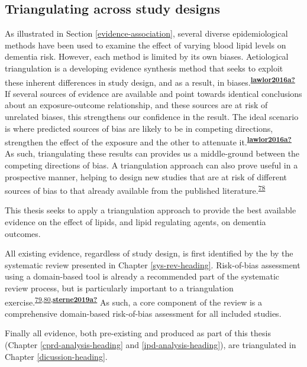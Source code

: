 \documentclass[a4paper, twoside]{templates/ociamthesis}
\begin{document}
\hypertarget{intro-triangulation}{%
\subsection{Triangulating across study designs}\label{intro-triangulation}}

As illustrated in Section \ref{evidence-association}, several diverse epidemiological methods have been used to examine the effect of varying blood lipid levels on dementia risk. However, each method is limited by its own biases. Aetiological triangulation is a developing evidence synthesis method that seeks to exploit these inherent differences in study design, and as a result, in biases.\textsuperscript{\protect\hyperlink{ref-lawlor2016a}{\textbf{lawlor2016a?}}} If several sources of evidence are available and point towards identical conclusions about an exposure-outcome relationship, and these sources are at risk of unrelated biases, this strengthens our confidence in the result. The ideal scenario is where predicted sources of bias are likely to be in competing directions, strengthen the effect of the exposure and the other to attenuate it.\textsuperscript{\protect\hyperlink{ref-lawlor2016a}{\textbf{lawlor2016a?}}} As such, triangulating these results can provides us a middle-ground between the competing directions of bias. A triangulation approach can also prove useful in a prospective manner, helping to design new studies that are at risk of different sources of bias to that already available from the published literature.\textsuperscript{\protect\hyperlink{ref-munafo2018}{78}}

This thesis seeks to apply a triangulation approach to provide the best available evidence on the effect of lipids, and lipid regulating agents, on dementia outcomes.

All existing evidence, regardless of study design, is first identified by the by the systematic review presented in Chapter \ref{sys-rev-heading}. Risk-of-bias assessment using a domain-based tool is already a recommended part of the systematic review process, but is particularly important to a triangulation exercise.\textsuperscript{\protect\hyperlink{ref-page2021}{79},\protect\hyperlink{ref-mcguinness2018}{80},\protect\hyperlink{ref-sterne2019a}{\textbf{sterne2019a?}}} As such, a core component of the review is a comprehensive domain-based risk-of-bias assessment for all included studies.

Finally all evidence, both pre-existing and produced as part of this thesis (Chapter \ref{cprd-analysis-heading} and \ref{ipd-analysis-heading}), are triangulated in Chapter \ref{dicussion-heading}.
\end{document}
